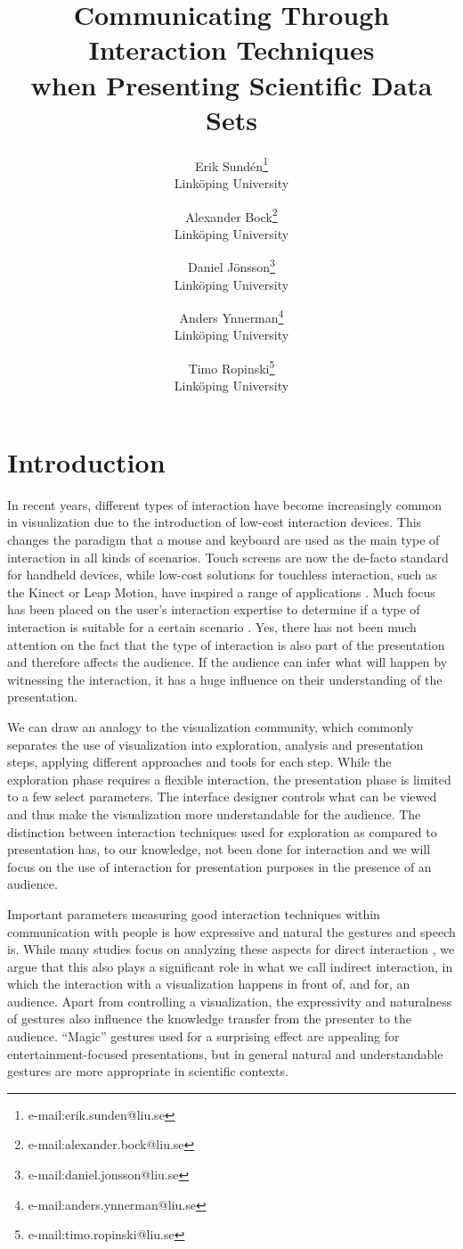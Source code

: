 \documentclass[review,journal]{vgtc}         %
\title{Communicating Through Interaction Techniques\\when Presenting Scientific Data Sets} %
\author{Erik Sund\'en\thanks{e-mail:erik.sunden@liu.se}\\ %
        \scriptsize Link{\"o}ping University %
\and Alexander Bock\thanks{e-mail:alexander.bock@liu.se}\\ %
			   \scriptsize Link{\"o}ping University %
\and Daniel J\"onsson\thanks{e-mail:daniel.jonsson@liu.se}\\ %
          \scriptsize Link{\"o}ping University %
\and Anders Ynnerman\thanks{e-mail:anders.ynnerman@liu.se}\\ %
          \scriptsize Link{\"o}ping University %
\and Timo Ropinski\thanks{e-mail:timo.ropinski@liu.se}\\ %
           \scriptsize Link{\"o}ping University }
\begin{document}
\maketitle

\section{Introduction}\label{sec:introduction}
In recent years, different types of interaction have become increasingly common in visualization due to the introduction of low-cost interaction devices.
This changes the paradigm that a mouse and keyboard are used as the main type of interaction in all kinds of scenarios.
Touch screens are now the de-facto standard for handheld devices, while low-cost solutions for touchless interaction, such as the Kinect or Leap Motion, have inspired a range of applications \cite{zora82163, OHaraGSPVMCCRDC14}.
Much focus has been placed on the user's interaction expertise to determine if a type of interaction is suitable for a certain scenario \cite{DBLP:journals/tvcg/YiKSJ07}.
Yes, there has not been much attention on the fact that the type of interaction is also part of the presentation and therefore affects the audience.
If the audience can infer what will happen by witnessing the interaction, it has a huge influence on their understanding of the presentation.

We can draw an analogy to the visualization community, which commonly separates the use of visualization into exploration, analysis and presentation steps, applying different approaches and tools for each step.
While the exploration phase requires a flexible interaction, the presentation phase is limited to a few select parameters.
The interface designer controls what can be viewed and thus make the visualization more understandable for the audience.
The distinction between interaction techniques used for exploration as compared to presentation has, to our knowledge, not been done for interaction and we will focus on the use of interaction for presentation purposes in the presence of an audience.

Important parameters measuring good interaction techniques within communication with people is how expressive and natural the gestures and speech is.
While many studies focus on analyzing these aspects for direct interaction \cite{978-3-642-12552-2, Caridakis:2013:NIE:2504335.2504378}, we argue that this also plays a significant role in what we call indirect interaction, in which the interaction with a visualization happens in front of, and for, an audience.
Apart from controlling a visualization, the expressivity and naturalness of gestures also influence the knowledge transfer from the presenter to the audience.
``Magic'' gestures used for a surprising effect are appealing for entertainment-focused presentations, but in general natural and understandable gestures are more appropriate in scientific contexts.
\end{document}
